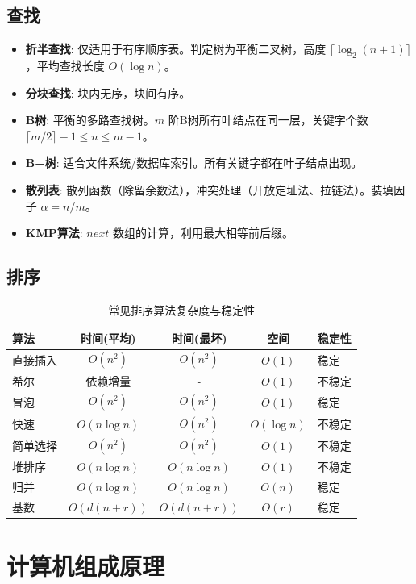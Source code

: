 \documentclass[cn,hazy,blue,12pt,screen,normal]{elegantnote}
\begin{document}
\subsection{查找}
\begin{itemize}
    \item \textbf{折半查找}: 仅适用于有序顺序表。判定树为平衡二叉树，高度 $\lceil \log_2(n+1) \rceil$，平均查找长度 $O(\log n)$。
    \item \textbf{分块查找}: 块内无序，块间有序。
    \item \textbf{B树}: 平衡的多路查找树。$m$ 阶B树所有叶结点在同一层，关键字个数 $\lceil m/2 \rceil - 1 \leq n \leq m-1$。
    \item \textbf{B+树}: 适合文件系统/数据库索引。所有关键字都在叶子结点出现。
    \item \textbf{散列表}: 散列函数（除留余数法），冲突处理（开放定址法、拉链法）。装填因子 $\alpha = n/m$。
    \item \textbf{KMP算法}: $next$ 数组的计算，利用最大相等前后缀。
\end{itemize}

\subsection{排序}
\begin{table}[htb]
\centering
\caption{常见排序算法复杂度与稳定性}
\begin{tabular}{l|c|c|c|l}
\toprule
算法 & 时间(平均) & 时间(最坏) & 空间 & 稳定性 \\
\midrule
直接插入 & $O(n^2)$ & $O(n^2)$ & $O(1)$ & 稳定 \\
希尔 & 依赖增量 & - & $O(1)$ & 不稳定 \\
冒泡 & $O(n^2)$ & $O(n^2)$ & $O(1)$ & 稳定 \\
快速 & $O(n\log n)$ & $O(n^2)$ & $O(\log n)$ & 不稳定 \\
简单选择 & $O(n^2)$ & $O(n^2)$ & $O(1)$ & 不稳定 \\
堆排序 & $O(n\log n)$ & $O(n\log n)$ & $O(1)$ & 不稳定 \\
归并 & $O(n\log n)$ & $O(n\log n)$ & $O(n)$ & 稳定 \\
基数 & $O(d(n+r))$ & $O(d(n+r))$ & $O(r)$ & 稳定 \\
\bottomrule
\end{tabular}
\end{table}

\section{计算机组成原理}
\end{document}
